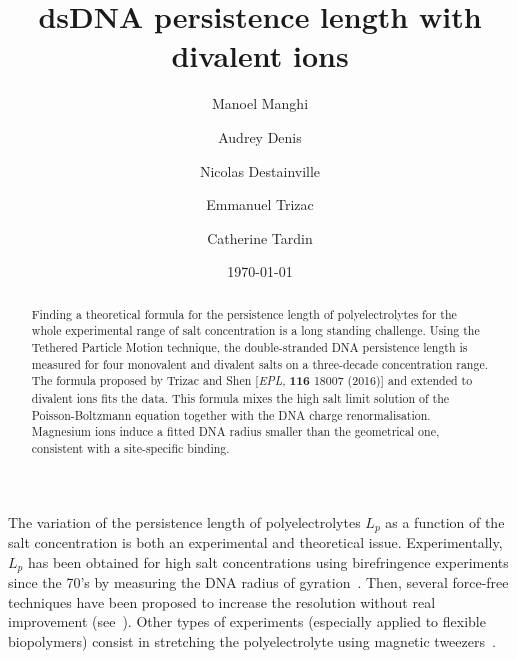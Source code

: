 \documentclass[aps,pre,twocolumn]{revtex4}
\begin{document}
\title{dsDNA persistence length with divalent ions}

\author{Manoel Manghi}
\author{Audrey Denis}
\author{Nicolas Destainville}
\author{Emmanuel Trizac}
\author{Catherine Tardin}

\date{\today}

\begin{abstract}
Finding a theoretical formula for the persistence length of polyelectrolytes for the whole experimental range of salt concentration is a long standing challenge. Using the Tethered Particle Motion technique, the double-stranded DNA persistence length is measured for four monovalent and divalent salts on a three-decade concentration range. The formula proposed by Trizac and Shen [\textit{EPL}, \textbf{116} 18007 (2016)] and extended to divalent ions fits the data. This formula mixes the high salt limit solution of the Poisson-Boltzmann equation together with the DNA charge renormalisation. Magnesium ions induce a fitted DNA radius smaller than the geometrical one, consistent with a site-specific binding.
\end{abstract}

\maketitle

The variation of the persistence length of polyelectrolytes $L_p$ as a function of the salt concentration is both an experimental and theoretical issue. Experimentally, $L_p$ has been obtained for high salt concentrations using birefringence experiments since the 70's by measuring the DNA radius of gyration~\cite{Harrington1978}. Then, several force-free techniques have been proposed to increase the resolution without real improvement (see~\cite{Savelyev2012,Macromolecules}). Other types of experiments (especially applied to flexible biopolymers) consist in stretching the polyelectrolyte using magnetic tweezers~\cite{Baumann1997,Saleh2009,Innes-Gold2021}.
\end{document}
